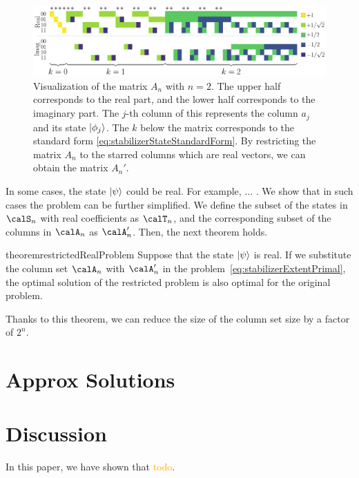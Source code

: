 \documentclass[a4paper, onecolumn, 11pt, longbibliography]{quantumarticle}
\newcommand{\orange}[1]{\textcolor{orange}{#1}}
\begin{document}
\begin{figure}[htbp]
    \centering
    \includegraphics[width=\columnwidth]{imgs/Amat.pdf}
    \caption{
        Visualization of the matrix $A_n$ with $n=2$.
        The upper half corresponds to the real part,
        and the lower half corresponds to the imaginary part.
        The $j$-th column of this represents
        the column $a_j$ and its state $\ket{\phi_j}$.
        The $k$ below the matrix
        corresponds to
        the standard form \eqref{eq:stabilizerStateStandardForm}.
        By restricting the matrix $A_n$
        to the starred columns
        which are real vectors,
        we can obtain the matrix $A_n'$.
    }
    \label{fig:Amat}
\end{figure}

In some cases, the state $\ket{\psi}$ could be real.
For example, ... .
We show that in such cases the problem can be further simplified.
We define the subset of the states in $\calS_n$ with real coefficients as $\calT_n$,
and the corresponding subset of the columns in $\calA_n$ as $\calA'_n$.
Then, the next theorem holds.
\begin{restatable}{theorem}{restrictedRealProblem}
    \label{thm:restrictedRealProblem}
    Suppose that the state $\ket{\psi}$ is real.
    If we substitute the column set $\calA_n$ with $\calA'_n$
    in the problem~\eqref{eq:stabilizerExtentPrimal},
    the optimal solution of the restricted problem
    is also optimal for the original problem.
\end{restatable}

Thanks to this theorem,
we can reduce the size of the column set size
by a factor of $2^n$.

\section{Approx Solutions}

\section{Discussion}

In this paper, we have shown that \orange{todo}.
\end{document}
